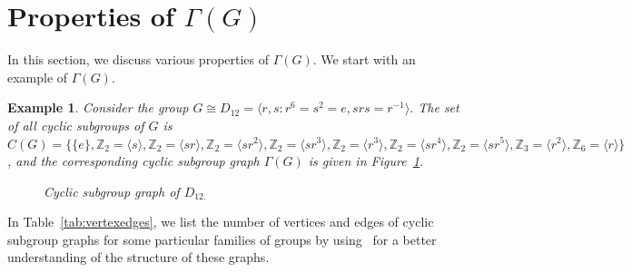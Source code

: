 \documentclass[11pt,twoside]{amsart}
\newcommand{\vertex}{\node[vertex]}
\def \Z {{\mathbb{Z}}}
\def \Ga {{\Gamma }}
\newtheorem{ex}[theorem]{Example}
\begin{document}
\section{Properties of $\Ga(G)$}\label{sec:2}
In this section, we discuss various properties of $\Ga (G)$. We start with an example of $\Ga (G)$.
\begin{ex}\label{example1}
Consider the group $G\cong D_{12}=\langle r, s:r^6=s^2=e, srs=r^{-1}\rangle.$ The set of all cyclic subgroups of $G$ is $C(G)=\{\{e\}, \Z_2=\langle s\rangle, \Z_2=\langle sr\rangle, \Z_2=\langle sr^2\rangle, \Z_2=\langle sr^3\rangle, \Z_2=\langle r^3\rangle, \Z_2=\langle sr^4\rangle, \Z_2=\langle sr^5\rangle, \Z_3=\langle r^2\rangle, \Z_6=\langle r\rangle\}$, and the corresponding cyclic subgroup graph $\Gamma (G)$ is given in Figure~\ref{fig45}.
\begin{figure}[!htbt]
  \centering
\caption{Cyclic subgroup graph of $D_{12.}$}
\label{fig45}
\end{figure}
\end{ex}
 In  Table~\ref{tab:vertexedges}, we list the number of vertices and edges of cyclic subgroup graphs for some particular families of groups by using~\cite{tuarnuauceanu2023number} for a better understanding of the structure of these graphs.
\end{document}
